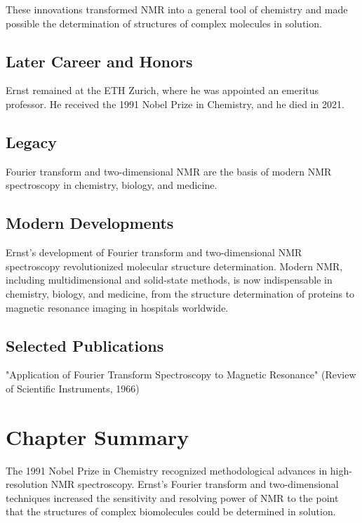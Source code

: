 These innovations transformed NMR into a general tool of chemistry and made possible the determination of structures of complex molecules in solution.

\subsection*{Later Career and Honors}

Ernst remained at the ETH Zurich, where he was appointed an emeritus professor. He received the 1991 Nobel Prize in Chemistry, and he died in 2021.

\subsection*{Legacy}

Fourier transform and two-dimensional NMR are the basis of modern NMR spectroscopy in chemistry, biology, and medicine.

\subsection*{Modern Developments}

Ernst's development of Fourier transform and two-dimensional NMR spectroscopy revolutionized molecular structure determination. Modern NMR, including multidimensional and solid-state methods, is now indispensable in chemistry, biology, and medicine, from the structure determination of proteins to magnetic resonance imaging in hospitals worldwide.

\subsection*{Selected Publications}

"Application of Fourier Transform Spectroscopy to Magnetic Resonance" (Review of Scientific Instruments, 1966)

\clearpage

\section*{Chapter Summary}

The 1991 Nobel Prize in Chemistry recognized methodological advances in high-resolution NMR spectroscopy. Ernst's Fourier transform and two-dimensional techniques increased the sensitivity and resolving power of NMR to the point that the structures of complex biomolecules could be determined in solution.
